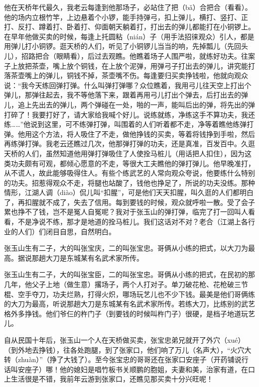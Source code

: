 \documentclass[12pt,UTF8]{ctexbook}
\begin{document}
他在天桥年代最久，我老云每逢到他那场子，必站住了把（bǎ）合把合（看看）。他的场内立根竹竿，上边悬着个小锣，能手持弹弓，扣上弹儿，横打、竖打、正打、反打、蹲着打、卧着打、仰面朝天躺着打，打出去的弹儿都能打在小铜锣上。在早年他做买卖的时候，每逢上托圆粘（nián）子（用手法招徕观众）引人，都是用弹儿打小铜锣。逛天桥的人们，听见了小铜锣儿当当的响，先掉瓢儿（先回头儿），招路把合（眼睛看），后过去观瞧。他瞧着场子人围严啦，就练好功夫。往案子上放把茶壶，嘴上放个铜钱，在上放个泥弹，用弹弓子打出去的弹儿，讲究能打落茶壶嘴上的弹儿，铜钱不掉，茶壶嘴不伤。每逢要归买卖挣钱啦，他就向观众说：“我今天练回弹打弹。什么叫弹打弹哪？众位瞧着，我用弓儿往天空上打出个弹儿，那弹往起去，我不等他落下来，跟着再用弓儿打出个弹去，后打出去的弹儿，追上先出去的弹儿，两个弹碰在一处，啪的一声，能叫后出的弹，将先出的弹打碎了！我要打好了，请大家给我喊个好儿。说练就练，净练这手不算功夫，我还练……”他说到这里，可不练弹打弹，叫围着的人们听着都不走，净等着瞧他练弹打弹。他用这个方法，将人吸住了不走，做他挣钱的买卖，等着将钱挣到手啦，然后再练弹打弹。我老云还瞧过几次，他那弹打弹的功夫，还是真准，百发百中。久逛天桥的人们，虽然知道他用弹打弹吸住了人使拴马桩儿（用话把人扣住），因为这类功夫颇有可观，都倾心愿意的不走，等很大工夫瞧他的弹打弹儿。他早晚准打，从不谎人，故此能够吸得住人。有些个练武艺的人常向观众夸说，他要练什么特别的功夫。招惹得观众不走，将腿也站酸了，钱他也挣足了，所说的功夫没练。那种情形，江湖人调（diào）侃儿叫“扣腥”，可是他们天天扣腥，叫久逛的人们都明白了，再扣腥就不成了，失去了信用。每到要钱的时候，观众就呼啦一散。受了会子累也挣不了钱，岂不是冤人自冤呢？我对于张玉山的弹打弹，临完了打一回叫人看看，不是净说不练，那才是地道的拴马桩儿。我们这话对不对？老合（江湖上各行业的人们）们闭目自思，自然明白。

张玉山生有二子，大的叫张宝庆，二的叫张宝忠。哥俩从小练的把式，以大刀为最高。据说那趟大刀是东城某有名武术家所传。



张玉山生有二子，大的叫张宝臣，二的叫张宝忠。哥俩从小练的把式，在民初的那几年，他父子上地（做生意）撂场子，两个人打对子。单刀破花枪、花枪破三节棍、空手夺刀，功夫烂熟，打得火炽，哪场玩艺儿也不少下钱。最美是他们哥俩练的大刀为最高，听说那趟大刀是东城某有名武术家所传。若练大刀，比练别的武艺格外多挣钱。他们爷仨的杵门子（到要钱的时候叫杵门子）很硬，是档子地道玩艺儿。

自从民国十年后，张玉山一个人在天桥做买卖，张宝忠弟兄就开了外穴（xué）（到外地去挣钱），往各处跑腿，到了张家口，他们响了万儿（名声大），“火穴大转（zhuàn）”（挣了大钱了）。至今张宝忠的哥哥还在张家口安座子（开药铺说行话叫安座子）哪！他的媳妇是唱竹板书关顺鹏的胞姐，夫妻和美，治家有道，在口上生活很是不错，我前年云游到张家口，还瞧见那买卖十分兴旺呢！
\end{document}

